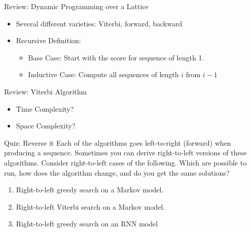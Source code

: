 \documentclass{beamer}
\def\Lattice{
    \matrix (network)
    [matrix of nodes,
    nodes in empty cells,
    ampersand replacement=\&,
    column sep={1cm},
    row sep={0.1cm},
    nodes={outer sep=0pt,circle,minimum size=0.5cm, minimum width=1.3cm,draw, rectangle} ]
    {
     O \& O \& O \& O \& O\\
     I-PER \& I-PER \& I-PER \& I-PER \& I-PER \\ 
     I-ORG \& I-ORG \& I-ORG \& I-ORG \& I-ORG \\ 
     I-LOC \& I-LOC \& I-LOC \& I-LOC \& I-LOC \\ 
     |[draw=none]| \\
     |[draw=none]| Mayor \& |[draw=none]| DeBlasio \& |[draw=none]| from \& |[draw=none]| New  \& |[draw=none]| York  \\  
};
}
\begin{document}
\begin{frame}{Review: Dynamic Programming over a Lattice}
  \begin{itemize}
  \item Several different varieties: Viterbi, forward, backward

  \item Recursive Definition:
    \begin{itemize}
    \item Base Case: Start with the score for sequence of length 1.  \air
    \item Inductive Case: Compute all sequences of length $i$ from $i-1$ 
    \end{itemize}
  \end{itemize}

  \begin{center}   
  \end{center}  
\end{frame}


\begin{frame}{Review: Viterbi Algorithm}
  \begin{algorithmic}
    \EndFor{}
    \EndFor{}
    \EndProcedure{}
  \end{algorithmic}
  \begin{itemize}
  \item Time Complexity?
  \item Space Complexity?
  \end{itemize}
\end{frame}

\begin{frame}{Quiz: Reverse it}
  Each of the algorithms goes left-to-right (forward) when producing 
  a sequence. Sometimes you can derive right-to-left versions 
  of these algorithms. Consider right-to-left cases of the 
  following. Which are possible to run, how does the algorithm change, and 
  do you get the same solutions?

  \begin{enumerate}
  \item Right-to-left greedy search on a Markov model.
  \item Right-to-left Viterbi search on a Markov model.
  \item Right-to-left greedy search on an RNN model
  \end{enumerate}

\end{frame}
\end{document}

